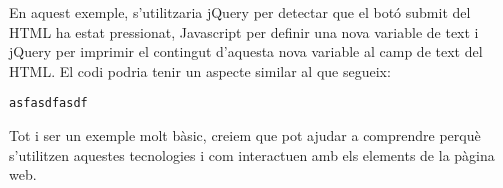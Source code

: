     En aquest exemple, s'utilitzaria jQuery per detectar que el botó submit del HTML ha estat pressionat, Javascript per definir una nova variable de text i jQuery per imprimir el contingut d’aquesta nova variable al camp de text del HTML. El codi podria tenir un aspecte similar al que segueix:

\begin{lstlisting}[style=rawOwn,caption={Example of jQuery and Javascript}]
    asfasdfasdf
\end{lstlisting}

    Tot i ser un exemple molt bàsic, creiem que pot ajudar a comprendre perquè s'utilitzen aquestes tecnologies i com interactuen amb els elements de la pàgina web.
